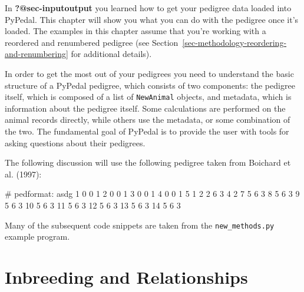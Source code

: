\documentclass[
  letterpaper,
  DIV=11,
  numbers=noendperiod]{scrreprt}
\newenvironment{Shaded}{\begin{snugshade}}{\end{snugshade}}
\newcommand{\CommentTok}[1]{\textcolor[rgb]{0.37,0.37,0.37}{#1}}
\newcommand{\DecValTok}[1]{\textcolor[rgb]{0.68,0.00,0.00}{#1}}
\begin{document}
In \textbf{?@sec-inputoutput} you learned how to get your pedigree data
loaded into PyPedal. This chapter will show you what you can do with the
pedigree once it's loaded. The examples in this chapter assume that
you're working with a reordered and renumbered pedigree (see
Section~\ref{sec-methodology-reordering-and-renumbering} for additional
details).

In order to get the most out of your pedigrees you need to understand
the basic structure of a PyPedal pedigree, which consists of two
components: the pedigree itself, which is composed of a list of
\texttt{NewAnimal} objects, and metadata, which is information about the
pedigree itself. Some calculations are performed on the animal records
directly, while others use the metadata, or some combination of the two.
The fundamental goal of PyPedal is to provide the user with tools for
asking questions about their pedigrees.

The following discussion will use the following pedigree taken from
Boichard et al. (1997):

\begin{Shaded}
\begin{Highlighting}[]
\CommentTok{\# pedformat: asdg}
\DecValTok{1} \DecValTok{0} \DecValTok{0} \DecValTok{1}
\DecValTok{2} \DecValTok{0} \DecValTok{0} \DecValTok{1}
\DecValTok{3} \DecValTok{0} \DecValTok{0} \DecValTok{1}
\DecValTok{4} \DecValTok{0} \DecValTok{0} \DecValTok{1}
\DecValTok{5} \DecValTok{1} \DecValTok{2} \DecValTok{2}
\DecValTok{6} \DecValTok{3} \DecValTok{4} \DecValTok{2}
\DecValTok{7} \DecValTok{5} \DecValTok{6} \DecValTok{3}
\DecValTok{8} \DecValTok{5} \DecValTok{6} \DecValTok{3}
\DecValTok{9} \DecValTok{5} \DecValTok{6} \DecValTok{3}
\DecValTok{10} \DecValTok{5} \DecValTok{6} \DecValTok{3}
\DecValTok{11} \DecValTok{5} \DecValTok{6} \DecValTok{3}
\DecValTok{12} \DecValTok{5} \DecValTok{6} \DecValTok{3}
\DecValTok{13} \DecValTok{5} \DecValTok{6} \DecValTok{3}
\DecValTok{14} \DecValTok{5} \DecValTok{6} \DecValTok{3}
\end{Highlighting}
\end{Shaded}

Many of the subsequent code snippets are taken from the
\texttt{new\_methods.py} example program.

\section{Inbreeding and Relationships}\label{sec-computing-inbreeding}
\end{document}
